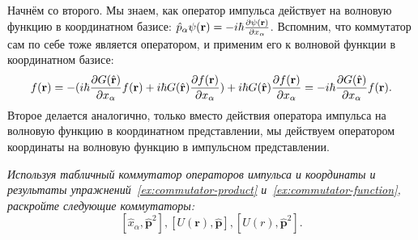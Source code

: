 Начнём со второго. Мы знаем, как оператор импульса действует на волновую
функцию в координатном базисе: $\hat p_{\alpha} \psi(\mathbf r) = -i \hbar
  \frac{\partial \psi(\mathbf r)}{\partial x_{\alpha}}$. Вспомним, что коммутатор сам по себе тоже
является оператором, и применим его к волновой функции в координатном базисе:
\begin{gather*}
  [\hat p_{\alpha}, G(\hat{\mathbf{r}})] f(\mathbf{r}) =
  -(i\hbar \pd{G(\hat{\mathbf{r}})}{x_{\alpha}}f(\mathbf{r}) +
  i\hbar G(\hat{\mathbf{r}}) \pd{f(\mathbf{r})}{x_{\alpha}}) +
  i\hbar G(\hat{\mathbf{r}})\pd{f(\mathbf{r})}{x_{\alpha}} =
  -i\hbar \pd{G(\hat{\mathbf{r}})}{x_{\alpha}} f(\mathbf{r}).
\end{gather*}
Второе делается аналогично, только вместо действия оператора импульса на
волновую функцию в координатном представлении, мы действуем оператором
координаты на волновую функцию в импульсном представлении.
\qedsq

\begin{exercise}\label{ex:commutator-expand}
  \textit{Используя табличный коммутатор операторов импульса и координаты и
    результаты упражнений \textnumero\,\ref{ex:commutator-product} и
    \textnumero\,\ref{ex:commutator-function}, раскройте следующие коммутаторы:}
  \[
    [\hat x_{\alpha}, \hat{\mathbf{p}}^2], [U(\mathbf{r}), \hat{\mathbf{p}}], [U(r), \hat{\mathbf{p}}^2].
  \]
\end{exercise}

